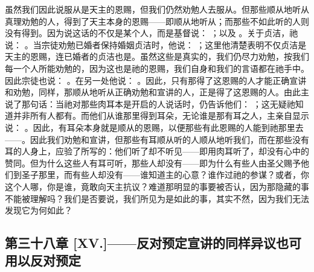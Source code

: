 虽然我们因此说服从是天主的恩赐，但我们仍然劝勉人去服从。但那些顺从地听从真理劝勉的人，得到了天主本身的恩赐——即顺从地听从；而那些不如此听的人则没有得到。因为说这话的不仅是某个人，而是基督说： ；以及 。关于贞洁，祂说： 。当宗徒劝勉已婚者保持婚姻贞洁时，他说： ；这里他清楚表明不仅贞洁是天主的恩赐，连已婚者的贞洁也是。虽然这些是真实的，我们仍尽力劝勉，按我们每一个人所能劝勉的，因为这也是祂的恩赐，我们自身和我们的言语都在祂手中。因此宗徒也说： 。在另一处他说： 。因此，只有那得了这恩赐的人才能正确宣讲和劝勉，同样，那顺从地听从正确劝勉和宣讲的人，正是得了这恩赐的人。由此主说了那句话：当祂对那些肉耳本是开启的人说话时，仍告诉他们： ；这无疑祂知道并非所有人都有。而他们从谁那里得到耳朵，无论谁是那有耳之人，主亲自显示说： 。因此，有耳朵本身就是顺从的恩赐，以便那些有此恩赐的人能到祂那里去——。因此我们劝勉和宣讲，但那些有耳顺从听的人顺从地听我们，而在那些没有耳的人身上，应验了所写的：他们听了却不听见——即用肉耳听了，却没有心中的赞同。但为什么这些人有耳可听，那些人却没有——即为什么有些人由圣父赐予他们到圣子那里，而有些人却没有——谁知道主的心意？谁作过祂的参谋？或者，你这个人哪，你是谁，竟敢向天主抗议？难道那明显的事要被否认，因为那隐藏的事不能被理解吗？我们是否要说，我们所见为是如此的事，其实不然，因为我们无法发现它为何如此？\par


\subsection{第三十八章 [XV.]——反对预定宣讲的同样异议也可用以反对预定}

